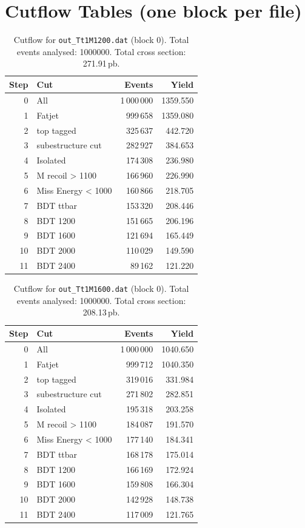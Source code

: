 \documentclass{article}
\begin{document}
\section*{Cutflow Tables (one block per file)}
\begin{table}[H]
\centering
\begin{tabular}{r l r r}
\toprule
Step & Cut & Events & Yield \\
\midrule
0 & All & 1\,000\,000 & 1359.550 \\
1 & Fatjet & 999\,658 & 1359.080 \\
2 & top tagged & 325\,637 & 442.720 \\
3 & subestructure cut & 282\,927 & 384.653 \\
4 & Isolated & 174\,308 & 236.980 \\
5 & M recoil > 1100 & 166\,960 & 226.990 \\
6 & Miss Energy < 1000 & 160\,866 & 218.705 \\
7 & BDT ttbar & 153\,320 & 208.446 \\
8 & BDT 1200 & 151\,665 & 206.196 \\
9 & BDT 1600 & 121\,694 & 165.449 \\
10 & BDT 2000 & 110\,029 & 149.590 \\
11 & BDT 2400 & 89\,162 & 121.220 \\
\bottomrule
\end{tabular}
\caption{Cutflow for \texttt{out\_Tt1M1200.dat} (block 0). Total events analysed: 1000000. Total cross section: 271.91\,pb.}
\label{tab:cutflow-out-Tt1M1200-dat}
\end{table}

\begin{table}[H]
\centering
\begin{tabular}{r l r r}
\toprule
Step & Cut & Events & Yield \\
\midrule
0 & All & 1\,000\,000 & 1040.650 \\
1 & Fatjet & 999\,712 & 1040.350 \\
2 & top tagged & 319\,016 & 331.984 \\
3 & subestructure cut & 271\,802 & 282.851 \\
4 & Isolated & 195\,318 & 203.258 \\
5 & M recoil > 1100 & 184\,087 & 191.570 \\
6 & Miss Energy < 1000 & 177\,140 & 184.341 \\
7 & BDT ttbar & 168\,178 & 175.014 \\
8 & BDT 1200 & 166\,169 & 172.924 \\
9 & BDT 1600 & 159\,808 & 166.304 \\
10 & BDT 2000 & 142\,928 & 148.738 \\
11 & BDT 2400 & 117\,009 & 121.765 \\
\bottomrule
\end{tabular}
\caption{Cutflow for \texttt{out\_Tt1M1600.dat} (block 0). Total events analysed: 1000000. Total cross section: 208.13\,pb.}
\label{tab:cutflow-out-Tt1M1600-dat}
\end{table}
\end{document}
